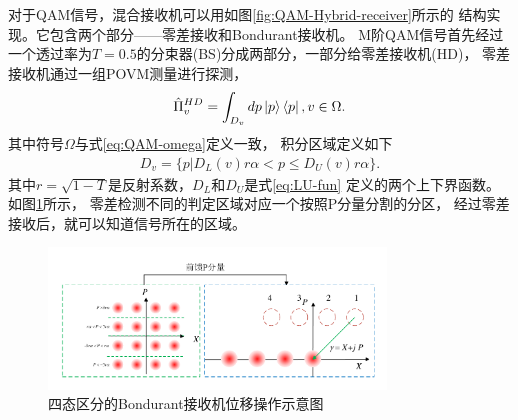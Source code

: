 对于QAM信号，混合接收机可以用如图\ref{fig:QAM-Hybrid-receiver}所示的
结构实现。它包含两个部分——零差接收和Bondurant接收机。
M阶QAM信号首先经过一个透过率为$T=0.5$的分束器(BS)分成两部分，一部分给零差接收机(HD)，
零差接收机通过一组POVM测量进行探测，
\begin{equation}
\hat{\Pi}_v^{HD} = \int_{D_v} dp \ket{p}\bra{p}, v\in \Omega.
\end{equation}
其中符号$\Omega$与式\ref{eq:QAM-omega}定义一致，
积分区域定义如下
\begin{equation}
\begin{split}
D_v = \{p| D_L(v)r\alpha < p \le D_U(v) r\alpha\}.
\end{split}
\end{equation}
其中$r=\sqrt{1-T}$是反射系数，$D_L$和$D_U$是式\ref{eq:LU-fun}
定义的两个上下界函数。
如图\ref{fig:Q-Bondurant-displacemet}所示，
零差检测不同的判定区域对应一个按照P分量分割的分区，
经过零差接收后，就可以知道信号所在的区域。


\begin{figure}
\centering
  \includegraphics[width=0.8\textwidth]{figures/chap3/Q-Bondurant-displacemet}
  \caption{四态区分的Bondurant接收机位移操作示意图}
  \label{fig:Q-Bondurant-displacemet}
\end{figure}

